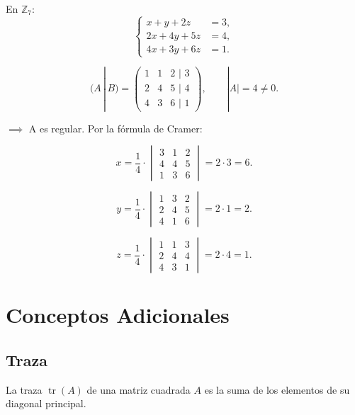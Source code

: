 \documentclass[a4paper,12pt]{article}
\begin{document}
\begin{ejemplo}
En $\mathbb{Z}_7$:
\[
\left\{
\begin{aligned}
x + y + 2z &= 3,\\
2x + 4y + 5z &= 4,\\
4x + 3y + 6z &= 1.
\end{aligned}
\right.
\]

\vspace{0.5em}

\[
(A\,|\,B)=
\begin{pmatrix}
1 & 1 & 2 \,\,\Big|\,\, 3\\
2 & 4 & 5 \,\,\Big|\,\, 4\\
4 & 3 & 6 \,\,\Big|\,\, 1
\end{pmatrix},
\qquad
|A| = 4 \neq 0.
\]

$\implies$ A es regular. Por la fórmula de Cramer:

\[
x = \frac{1}{4}\cdot
\begin{vmatrix}
3 & 1 & 2\\
4 & 4 & 5\\
1 & 3 & 6
\end{vmatrix}
= 2 \cdot 3 = 6.
\]

\[
y = \frac{1}{4}\cdot
\begin{vmatrix}
1 & 3 & 2\\
2 & 4 & 5\\
4 & 1 & 6
\end{vmatrix}
= 2 \cdot 1 = 2.
\]

\[
z = \frac{1}{4}\cdot
\begin{vmatrix}
1 & 1 & 3\\
2 & 4 & 4\\
4 & 3 & 1
\end{vmatrix}
= 2 \cdot 4 = 1.
\]

\end{ejemplo}

\section{Conceptos Adicionales}

\subsection{Traza}

\begin{procedimiento}[title=Traza]
La traza $\operatorname{tr}(A)$ de una matriz cuadrada $A$ es la suma de los elementos de su diagonal principal.
\end{procedimiento}
\end{document}
